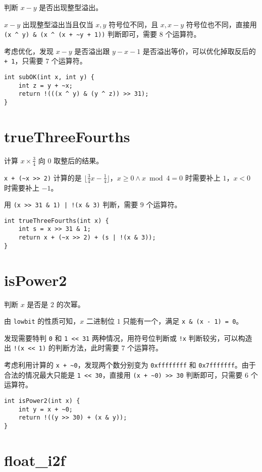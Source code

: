 \documentclass{noithesis}
\begin{document}
	判断 $x-y$ 是否出现整型溢出。
	
	$x-y$ 出现整型溢出当且仅当 $x,y$ 符号位不同，且 $x,x-y$ 符号位也不同，直接用 \verb|(x ^ y) & (x ^ (x + ~y + 1))| 判断即可，需要 $8$ 个运算符。
	
	考虑优化，发现 $x-y$ 是否溢出跟 $y-x-1$ 是否溢出等价，可以优化掉取反后的 \verb|+ 1|，只需要 $7$ 个运算符。
\begin{lstlisting}
int subOK(int x, int y) {
	int z = y + ~x;
	return !(((x ^ y) & (y ^ z)) >> 31);
}
\end{lstlisting}

	\section{trueThreeFourths}
	
	计算 $x\times \frac 34$ 向 $0$ 取整后的结果。
	
	\verb|x + (~x >> 2)| 计算的是 $\lfloor \frac 34 x - \frac 14 \rfloor$，$x\geq 0\land x\bmod 4 = 0$ 时需要补上 $1$，$x<0$ 时需要补上 $-1$。
	
	用 \verb[(x >> 31 & 1) | !(x & 3)[ 判断，需要 $9$ 个运算符。
\begin{lstlisting}
int trueThreeFourths(int x) {
	int s = x >> 31 & 1;
	return x + (~x >> 2) + (s | !(x & 3));
}
\end{lstlisting}

	\section{isPower2}
	
	判断 $x$ 是否是 $2$ 的次幂。
	
	由 \verb|lowbit| 的性质可知，$x$ 二进制位 $1$ 只能有一个，满足 \verb|x & (x - 1) = 0|。
	
	发现需要特判 \verb|0| 和 \verb|1 << 31| 两种情况，用符号位判断或 \verb|!x| 判断较劣，可以构造出 \verb|!(x << 1)| 的判断方法，此时需要 $7$ 个运算符。
	
	考虑利用计算的 \verb|x + ~0|，发现两个数分别变为 \verb|0xffffffff| 和 \verb|0x7fffffff|。由于合法的情况最大只能是 \verb|1 << 30|，直接用 \verb|(x + ~0) >> 30| 判断即可，只需要 $6$ 个运算符。
\begin{lstlisting}
int isPower2(int x) {
	int y = x + ~0;
	return !((y >> 30) + (x & y));
}
\end{lstlisting}
	
	\section{float\_i2f}
	
\end{document}
